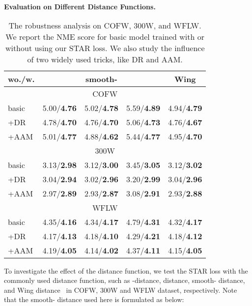 \documentclass[10pt,twocolumn,letterpaper]{article}
\begin{document}
\noindent\textbf{Evaluation on Different Distance Functions.}
\label{sec:abl:dist_func}
\begin{table}[t]
\centering
\footnotesize
\begin{tabular}{l|l|l|l|l}
\toprule
wo./w. & \multicolumn{1}{c|}{}  & \multicolumn{1}{c|}{smooth-}& \multicolumn{1}{c|}{} & \multicolumn{1}{c}{Wing}                   \\
\midrule
\multicolumn{5}{c}{COFW} \\ 
\midrule
basic  & {5.00/\textbf{4.76}} & {5.02/\textbf{4.78}} & {5.59/\textbf{4.89}} & {4.94/\textbf{4.79}} \\ 
+DR       & {4.78/\textbf{4.70}} & {4.76/\textbf{4.70}} & {5.06/\textbf{4.73}} & {4.76/\textbf{4.67}} \\ 
+AAM      & {5.01/\textbf{4.77}} & {4.88/\textbf{4.62}} & {5.44/\textbf{4.77}} & {4.95/\textbf{4.70}} \\
\midrule
\multicolumn{5}{c}{300W} \\
\midrule
basic  & {3.13/\textbf{2.98}} & {3.12/\textbf{3.00}} & {3.45/\textbf{3.05}} & {3.12/\textbf{3.02}} \\ 
+DR       & {3.04/\textbf{2.94}} & {3.02/\textbf{2.96}} & {3.20/\textbf{2.99}} & {3.04/\textbf{2.96}} \\ 
+AAM      & {2.97/\textbf{2.89}} & {2.93/\textbf{2.87}} & {3.08/\textbf{2.91}} & {2.93/\textbf{2.88}} \\
\midrule
\multicolumn{5}{c}{WFLW} \\
\midrule
basic  & {4.35/\textbf{4.16}} & {4.34/\textbf{4.17}} & {4.79/\textbf{4.31}} & {4.32/\textbf{4.17}} \\ 
+DR       & {4.17/\textbf{4.13}} & {4.18/\textbf{4.10}} & {4.29/\textbf{4.21}} & {4.18/\textbf{4.12}} \\ 
+AAM      & {4.19/\textbf{4.05}} & {4.14/\textbf{4.02}} & {4.37/\textbf{4.11}} & {4.15/\textbf{4.05}} \\
\bottomrule
\end{tabular}\vspace{-1.0em}
\caption{
The robustness analysis on COFW, 300W, and WFLW.
We report the NME score for basic model trained with or without using our STAR loss. We also study the influence of two widely used tricks, like DR and AAM. 
}
\vspace{-1.0em}
\label{tab: abl-dst}
\end{table}
To investigate the effect of the distance function, we test the STAR loss with the commonly used distance function, such as -distance,  distance, smooth- distance, and Wing distance~\cite{feng2018wing} in COFW, 300W and WFLW dataset, respectively. 
Note that the smooth- distance used here is formulated as below:
\end{document}
